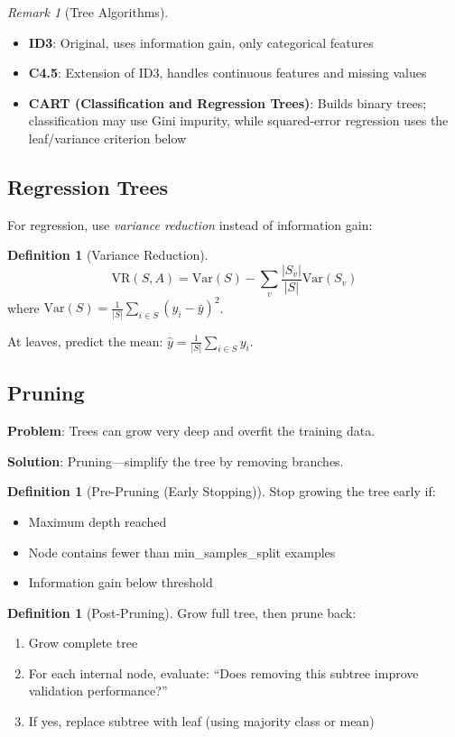 \documentclass[11pt,twoside]{article}
\numberwithin{equation}{section}
\newcommand{\Var}{\mathrm{Var}}
\theoremstyle{plain}
\theoremstyle{definition}
\newtheorem{definition}[theorem]{Definition}
\theoremstyle{remark}
\newtheorem{remark}[theorem]{Remark}
\begin{document}
\begin{remark}[Tree Algorithms]
\begin{itemize}
\item \textbf{ID3}: Original, uses information gain, only categorical features
\item \textbf{C4.5}: Extension of ID3, handles continuous features and missing values
\item \textbf{CART (Classification and Regression Trees)}: Builds binary trees; classification may use Gini impurity, while squared-error regression uses the leaf/variance criterion below
\end{itemize}
\end{remark}

\subsection{Regression Trees}

For regression, use \emph{variance reduction} instead of information gain:

\begin{definition}[Variance Reduction]
\[
\text{VR}(S, A) = \Var(S) - \sum_{v} \frac{|S_v|}{|S|} \Var(S_v)
\]
where $\Var(S) = \frac{1}{|S|}\sum_{i \in S}(y_i - \bar{y})^2$.

At leaves, predict the mean: $\hat{y} = \frac{1}{|S|}\sum_{i \in S} y_i$.
\end{definition}

\subsection{Pruning}

\textbf{Problem}: Trees can grow very deep and overfit the training data.

\textbf{Solution}: Pruning---simplify the tree by removing branches.

\begin{definition}[Pre-Pruning (Early Stopping)]
Stop growing the tree early if:
\begin{itemize}
\item Maximum depth reached
\item Node contains fewer than min\_samples\_split examples
\item Information gain below threshold
\end{itemize}
\end{definition}

\begin{definition}[Post-Pruning]
Grow full tree, then prune back:
\begin{enumerate}
\item Grow complete tree
\item For each internal node, evaluate: ``Does removing this subtree improve validation performance?''
\item If yes, replace subtree with leaf (using majority class or mean)
\end{enumerate}
\end{definition}
\end{document}
